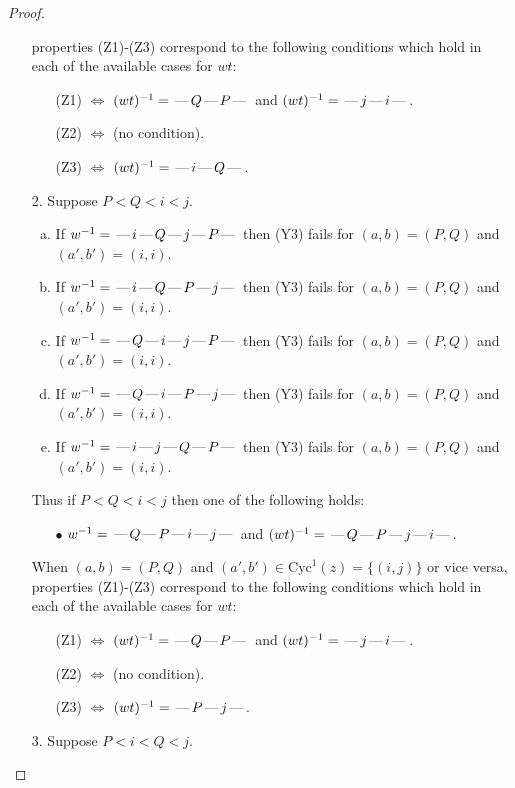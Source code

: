 \documentclass[10pt]{article}
\theoremstyle{definition}
\theoremstyle{definition}
\def\dash{\text{\hspace{0.5mm}---\hspace{0.5mm}}}
\def\Cyc{\mathrm{Cyc}}
\begin{document}
\begin{proof}
\begin{enumerate}
properties (Z1)-(Z3) correspond to the following conditions which
hold in each of the available cases for $wt$:
\begin{enumerate}
\item[](Z1) $\Leftrightarrow$ $(wt)^{-1} = \dash Q \dash P \dash$  and $(wt)^{-1} = \dash j \dash i \dash$.
\item[](Z2) $\Leftrightarrow$ (no condition).
\item[](Z3) $\Leftrightarrow$ $(wt)^{-1} = \dash i \dash Q \dash$.
\end{enumerate}
\item[$2$.] Suppose $P < Q < i < j$.
\begin{enumerate}[(a)]
\item If $w^{-1} = \dash i\dash Q\dash j\dash P\dash $ then (Y3) fails for $(a,b)=(P,Q)$ and $(a',b')=(i,i)$.
\item If $w^{-1} = \dash i\dash Q\dash P\dash j\dash $ then (Y3) fails for $(a,b)=(P,Q)$ and $(a',b')=(i,i)$.
\item If $w^{-1} = \dash Q\dash i\dash j\dash P\dash $ then (Y3) fails for $(a,b)=(P,Q)$ and $(a',b')=(i,i)$.
\item If $w^{-1} = \dash Q\dash i\dash P\dash j\dash $ then (Y3) fails for $(a,b)=(P,Q)$ and $(a',b')=(i,i)$.
\item If $w^{-1} = \dash i\dash j\dash Q\dash P\dash $ then (Y3) fails for $(a,b)=(P,Q)$ and $(a',b')=(i,i)$.
\end{enumerate}
Thus if $P < Q < i < j$ then one of the following holds:
\begin{enumerate}
\item[$\bullet$] $w^{-1} = \dash Q\dash P\dash i\dash j\dash $ and $(wt)^{-1} = \dash Q\dash P\dash j\dash i\dash $.
\end{enumerate}
When $(a,b)= (P,Q)$ and $(a',b')\in \Cyc^1(z)=\{(i,j)\}$ or vice versa,
properties (Z1)-(Z3) correspond to the following conditions which
hold in each of the available cases for $wt$:
\begin{enumerate}
\item[](Z1) $\Leftrightarrow$ $(wt)^{-1} = \dash Q \dash P \dash$  and $(wt)^{-1} = \dash j \dash i \dash$.
\item[](Z2) $\Leftrightarrow$ (no condition).
\item[](Z3) $\Leftrightarrow$ $(wt)^{-1} = \dash P \dash j \dash$.
\end{enumerate}
\item[$3$.] Suppose $P < i < Q < j$.
\begin{enumerate}[(a)]

\end{enumerate}
\end{enumerate}
\end{proof}
\end{document}
